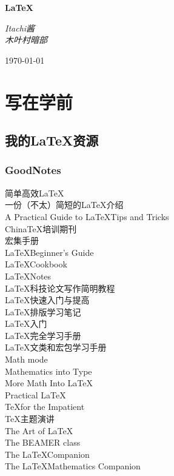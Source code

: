 \documentclass{book}%
\begin{document}
	\setlength{\parindent}{0pt}%
	
	\begin{titlepage}%
	\vspace*{\fill}
	\begin{center}
		\normalfont
		{\huge\bfseries \LaTeX }
		
		\bigskip
		{\Large\itshape Itachi酱\\木叶村暗部}
		
		\medskip
		\today
	\end{center}
	\end{titlepage}

    \thispagestyle{fancy}

	\newpage%
	\let\cleardoublepage\clearpage%

	\tableofcontents%
	
	\chapter{写在学前}
	
	\section{我的\LaTeX 资源}
	
	\subsection{GoodNotes}
	简单高效\LaTeX\\
	一份（不太）简短的\LaTeX 介绍\\
	A Practical Guide to \LaTeX\enspace Tips and Tricks\\
	China\TeX 培训期刊\\
	\CTeX 宏集手册\\
	\LaTeX\enspace Beginner's Guide\\
	\LaTeX\enspace Cookbook\\
	\LaTeX\enspace Notes\\
	\LaTeX 科技论文写作简明教程\\
	\LaTeX 快速入门与提高\\
	\LaTeX 排版学习笔记\\
	\LaTeX 入门\\
	\LaTeX 完全学习手册\\
	\LaTeX 文类和宏包学习手册\\
	Math mode\\
	Mathematics into Type\\
	More Math Into \LaTeX\\
	Practical \LaTeX\\
	\TeX\enspace for the Impatient\\
	\TeX 主题演讲\\
	The Art of \LaTeX\\
	The BEAMER class\\
	The \LaTeX\enspace Companion\\
	The \LaTeX\enspace Mathematics Companion\\
	
\end{document}
